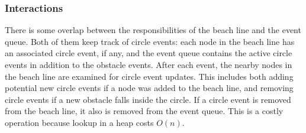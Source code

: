 \documentclass[conference]{IEEEtran}
\begin{document}
\subsubsection{Interactions}
There is some overlap between the responsibilities of the beach line and the event
queue. Both of them keep track of circle events: each node in the beach line
has an associated circle event, if any, and the event queue contains the
active circle events in addition to the obstacle events. After each event,
the nearby nodes in the beach line are examined for circle event updates. This
includes both adding potential new circle events if a node was added to the
beach line, and removing circle events if a new obstacle falls inside the
circle. If a circle event is removed from the beach line, it also is removed
from the event queue. This is a costly operation because lookup in a heap
costs $O(n)$.
\end{document}
